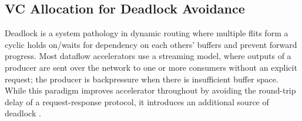 
\subsection{VC Allocation for Deadlock Avoidance} \label{sec:vc}
Deadlock is a system pathology in dynamic routing where multiple flits form a cyclic holds on/waits for dependency on each others' buffers and prevent forward progress.
Most dataflow accelerators use a streaming model, where outputs of a producer are sent over the network to one or more consumers
without an explicit request; the producer is backpressure when there is insufficient buffer space. 
While this paradigm improves accelerator throughout by avoiding the round-trip delay of a request-response protocol, it introduces an additional source of deadlock \cite{hansson2007avoiding}. 

